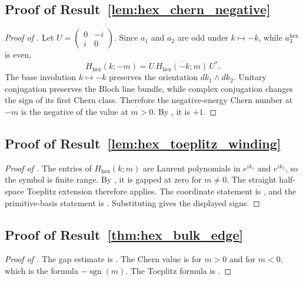 \documentclass[11pt]{article}
\numberwithin{equation}{section}
\theoremstyle{definition}
\theoremstyle{remark}
\newcommand{\hexagon}{\mathrm{hex}}
\begin{document}
\subsection{Proof of Result~\ref{lem:hex_chern_negative}}\label{app:proof:lem:hex_chern_negative}
\begin{proof}[Proof of ]
Let \(U=\begin{pmatrix}0&-i\\ i&0\end{pmatrix}\). Since \(a_1\) and \(a_2\) are odd under
\(k\mapsto-k\), while \(a_3^{\hexagon}\) is even,
\[
H_{\hexagon}(k;-m)=U\,\overline{H_{\hexagon}(-k;m)}\,U^* .
\]
The base involution \(k\mapsto-k\) preserves the orientation \(dk_1\wedge dk_2\). Unitary
conjugation preserves the Bloch line bundle, while complex conjugation changes the sign of its first
Chern class. Therefore the negative-energy Chern number at \(-m\) is the negative of the value at
\(m>0\). By , it is \(+1\).
\end{proof}

\subsection{Proof of Result~\ref{lem:hex_toeplitz_winding}}\label{app:proof:lem:hex_toeplitz_winding}
\begin{proof}[Proof of ]
The entries of \(H_{\hexagon}(k;m)\) are Laurent polynomials in \(e^{ik_1}\) and \(e^{ik_2}\), so the
symbol is finite range. By , it is gapped at zero for \(m\ne0\). The straight
half-space Toeplitz extension therefore applies. The coordinate statement is
, and the primitive-basis statement is
. Substituting
 gives the displayed signs.
\end{proof}

\subsection{Proof of Result~\ref{thm:hex_bulk_edge}}\label{app:proof:thm:hex_bulk_edge}
\begin{proof}[Proof of ]
The gap estimate is . The Chern value is
 for \(m>0\) and  for \(m<0\), which is the
formula \(-\operatorname{sgn}(m)\). The Toeplitz formula is
.
\end{proof}
\end{document}
